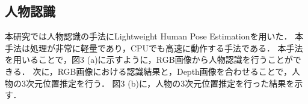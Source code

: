 \documentclass[a4j]{jarticle}
\begin{document}
\subsection{人物認識}
本研究では人物認識の手法にLightweight Human Pose Estimation\cite{light-openpose}を用いた．
本手法は処理が非常に軽量であり，CPUでも高速に動作する手法である．
本手法を用いることで，図3 (a)に示すように，RGB画像から人物認識を行うことができる．
次に，RGB画像における認識結果と，Depth画像を合わせることで，人物の3次元位置推定を行う．
図3 (b)に，人物の3次元位置推定を行った結果を示す．
\end{document}
